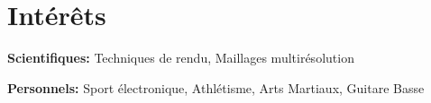 \documentclass[]{friggeri-cv} %
\begin{document}

\section{Intérêts}

\textbf{Scientifiques:} Techniques de rendu, Maillages multirésolution

\textbf{Personnels:} Sport électronique, Athlétisme, Arts Martiaux, Guitare Basse

\end{document}
